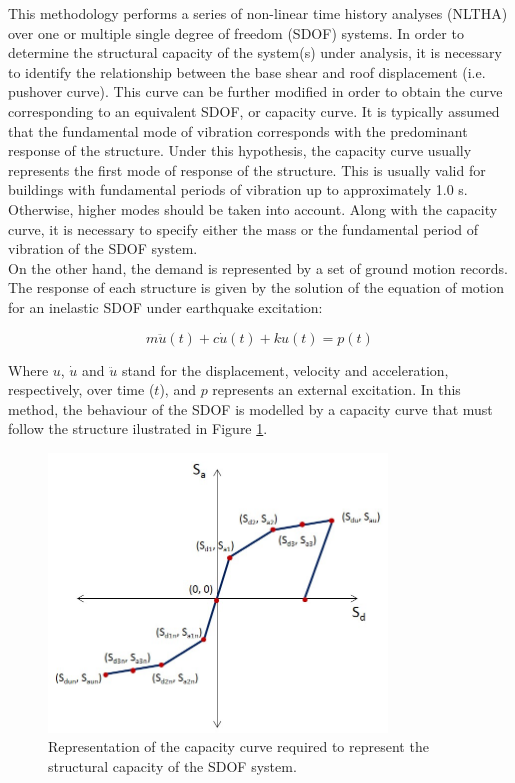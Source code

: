 This methodology performs a series of non-linear time history analyses (NLTHA) over one or multiple single degree of freedom (SDOF) systems. In order to determine the structural capacity of the system(s) under analysis, it is necessary to identify the relationship between the base shear and roof displacement (i.e. pushover curve). This curve can be further modified in order to obtain the curve corresponding to an equivalent SDOF, or capacity curve. It is typically assumed that the fundamental mode of vibration corresponds with the predominant response of the structure. Under this hypothesis, the capacity curve usually represents the first mode of response of the structure. This is usually valid for buildings with fundamental periods of vibration up to approximately 1.0 s. Otherwise, higher modes should be taken into account. Along with the capacity curve, it is necessary to specify either the mass or the fundamental period of vibration of the SDOF system.\\
On the other hand, the demand is represented by a set of ground motion records. 
The response of each structure is given by the solution of the equation of motion for an inelastic SDOF under earthquake excitation:
	 
\begin{equation}
m\ddot{u}(t) + c\dot{u}(t) + ku(t) = p(t)
\end{equation}

Where $u$, $\dot{u}$ and $\ddot{u}$ stand for the displacement, velocity and acceleration, respectively, over time ($t$), and $p$ represents an external excitation. In this method, the behaviour of the SDOF is modelled by a capacity curve that must follow the structure ilustrated in Figure \ref{fig:backbone}. 

\begin{figure}[htb]
  \centering
      \includegraphics[width=9cm]{Figures/backbone_curve.png}
  \caption{Representation of the capacity curve required to represent the structural capacity of the SDOF system.}
  \label{fig:backbone}
\end{figure}

